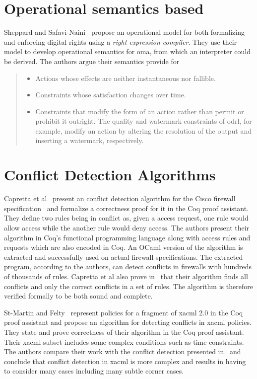 \section{Operational semantics based}
Sheppard and Safavi-Naini~\cite{SheppardS09} propose an operational model for both formalizing and enforcing digital rights using a \emph{right expression compiler}. They use their model to develop operational semantics for \ac{oma}, from which an interpreter could be derived. The authors argue their semantics provide for 
\begin{quote}
\begin{itemize}
  \item Actions whose effects are neither instantaneous nor fallible.
  \item Constraints whose satisfaction changes over time.
  \item Constraints that modify the form of an action rather than permit or prohibit it outright. The quality and watermark constraints
of \ac{odrl}, for example, modify an action by altering the resolution of the output and inserting a watermark, respectively.
\end{itemize}
\end{quote}

\section{Conflict Detection Algorithms}
Capretta et al~\cite{CaprettaSFM07} present an conflict detection algorithm for the Cisco firewall specification~\cite{ciscofirewall} and formalize a correctness proof for it in the Coq proof assistant. They define two rules being in conflict as, given a access request, one rule would allow access while the another rule would deny access. The authors present their algorithm in Coq's functional programming language along with access rules and requests which are also encoded in Coq. An OCaml version of
the algorithm is extracted and successfully used on actual firewall specifications. The extracted program, according to the authors, can detect conflicts in firewalls with hundreds of thousands of rules. Capretta et al also prove in~\cite{CaprettaSFM07} that their algorithm finds all conflicts and only the correct conflicts in a set of rules. The algorithm is therefore verified formally to be both sound and complete.

St-Martin and Felty~\cite{Stmartin} represent policies for a fragment of \ac{xacml} 2.0 in the Coq proof assistant and propose an algorithm for detecting conflicts in \ac{xacml} policies. They state and prove correctness of their algorithm in the Coq proof assistant. Their \ac{xacml} subset includes some complex conditions such as time constraints. The authors compare their work with the conflict detection presented in~\cite{CaprettaSFM07} and conclude that conflict detection in \ac{xacml} is more complex and results in having to consider many cases including many subtle corner cases. 

